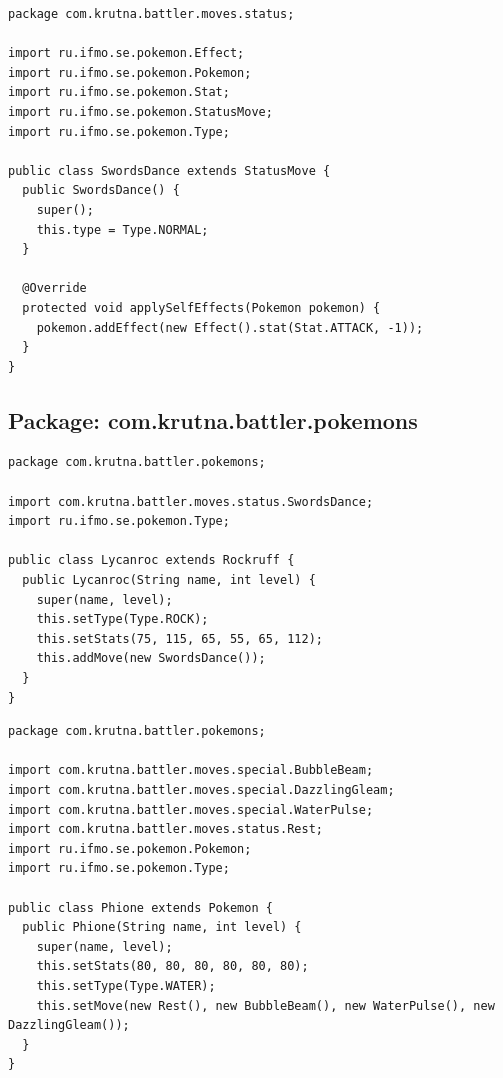 \documentclass[11pt]{article}
\begin{document}
\begin{lstlisting}
package com.krutna.battler.moves.status;

import ru.ifmo.se.pokemon.Effect;
import ru.ifmo.se.pokemon.Pokemon;
import ru.ifmo.se.pokemon.Stat;
import ru.ifmo.se.pokemon.StatusMove;
import ru.ifmo.se.pokemon.Type;

public class SwordsDance extends StatusMove {
  public SwordsDance() {
    super();
    this.type = Type.NORMAL;
  }

  @Override
  protected void applySelfEffects(Pokemon pokemon) {
    pokemon.addEffect(new Effect().stat(Stat.ATTACK, -1));
  }
}
\end{lstlisting}

\subsection{Package: com.krutna.battler.pokemons}
\label{sec:org165f548}
\begin{lstlisting}
package com.krutna.battler.pokemons;

import com.krutna.battler.moves.status.SwordsDance;
import ru.ifmo.se.pokemon.Type;

public class Lycanroc extends Rockruff {
  public Lycanroc(String name, int level) {
    super(name, level);
    this.setType(Type.ROCK);
    this.setStats(75, 115, 65, 55, 65, 112);
    this.addMove(new SwordsDance());
  }
}
\end{lstlisting}
\begin{lstlisting}
package com.krutna.battler.pokemons;

import com.krutna.battler.moves.special.BubbleBeam;
import com.krutna.battler.moves.special.DazzlingGleam;
import com.krutna.battler.moves.special.WaterPulse;
import com.krutna.battler.moves.status.Rest;
import ru.ifmo.se.pokemon.Pokemon;
import ru.ifmo.se.pokemon.Type;

public class Phione extends Pokemon {
  public Phione(String name, int level) {
    super(name, level);
    this.setStats(80, 80, 80, 80, 80, 80);
    this.setType(Type.WATER);
    this.setMove(new Rest(), new BubbleBeam(), new WaterPulse(), new DazzlingGleam());
  }
}
\end{lstlisting}
\end{document}
